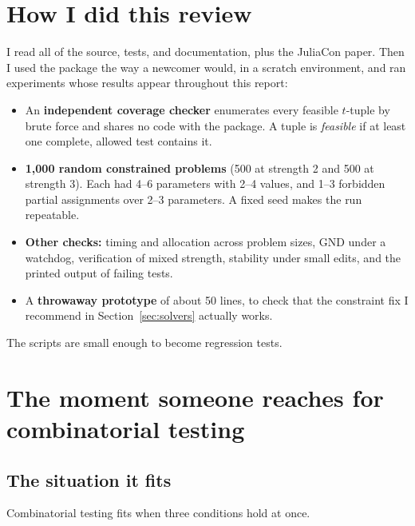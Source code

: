 \documentclass[11pt]{article}
\begin{document}
\section{How I did this review}

I read all of the source, tests, and documentation, plus the JuliaCon paper.
Then I used the package the way a newcomer would, in a scratch environment,
and ran experiments whose results appear throughout this report:

\begin{itemize}[leftmargin=1.5em]
\item An \textbf{independent coverage checker} enumerates every feasible
  $t$-tuple by brute force and shares no code with the package. A tuple is
  \emph{feasible} if at least one complete, allowed test contains it.
\item \textbf{1,000 random constrained problems} (500 at strength 2 and 500
  at strength 3). Each had 4--6 parameters with 2--4 values, and 1--3 forbidden
  partial assignments over 2--3 parameters. A fixed seed makes the run
  repeatable.
\item \textbf{Other checks:} timing and allocation across problem sizes, GND
  under a watchdog, verification of mixed strength, stability under small
  edits, and the printed output of failing tests.
\item A \textbf{throwaway prototype} of about 50 lines, to check that the
  constraint fix I recommend in Section~\ref{sec:solvers} actually works.
\end{itemize}

The scripts are small enough to become regression tests.

\section{The moment someone reaches for combinatorial testing}\label{sec:moment}

\subsection{The situation it fits}

Combinatorial testing fits when three conditions hold at once.
\end{document}
